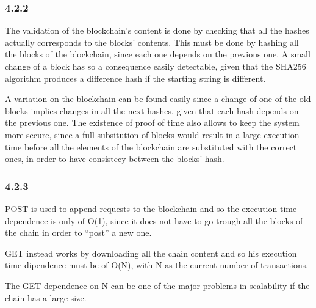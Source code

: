 \documentclass[11pt]{article}
\begin{document}
\hypertarget{section}{%
    \subsubsection*{4.2.2}\label{section}}

The validation of the blockchain's content is done by checking that all
the hashes actually corresponds to the blocks' contents. This must be
done by hashing all the blocks of the blockchain, since each one depends
on the previous one. A small change of a block has so a consequence
easily detectable, given that the SHA256 algorithm produces a difference
hash if the starting string is different.

A variation on the blockchain can be found easily since a change of one
of the old blocks implies changes in all the next hashes, given that
each hash depends on the previous one. The existence of proof of time
also allows to keep the system more secure, since a full subsitution of
blocks would result in a large execution time before all the elements of
the blockchain are substituted with the correct ones, in order to have
consistecy between the blocks' hash.

\hypertarget{section}{%
    \subsubsection*{4.2.3}\label{section}}

POST is used to append requests to the blockchain and so the execution
time dependence is only of O(1), since it does not have to go trough all
the blocks of the chain in order to ``post'' a new one.

GET instead works by downloading all the chain content and so his
execution time dipendence must be of O(N), with N as the current number
of transactions.

The GET dependence on N can be one of the major problems in scalability
if the chain has a large size.
\end{document}
